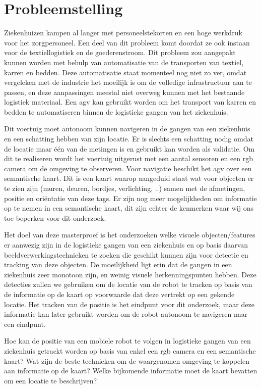 
\chapter{Probleemstelling}

Ziekenhuizen kampen al langer met personeelstekorten en een hoge werkdruk voor het zorgpersoneel. Een deel van dit probleem komt doordat ze ook instaan voor de textiellogistiek en de goederenstroom.
Dit probleem zou aangepakt kunnen worden met behulp van automatisatie van de transporten van textiel, karren en bedden. Deze automatisatie staat momenteel nog niet zo ver, omdat vergeleken met de industrie het moeilijk is om de volledige
infrastructuur aan te passen, en deze aanpassingen meestal niet overweg kunnen met het bestaande logistiek materiaal. Een \gls{agv} kan gebruikt worden om het transport van karren en bedden te automatiseren binnen de logistieke gangen van het ziekenhuis.

Dit voertuig moet autonoom kunnen navigeren in de gangen van een ziekenhuis en een schatting hebben van zijn locatie.
Er is slechts een schatting nodig omdat de locatie maar \'{e}\'{e}n van de metingen is en gebruikt kan worden als validatie.
Om dit te realiseren
wordt het voertuig uitgerust met een aantal sensoren en een \gls{rgb} camera om de omgeving te observeren. Voor navigatie beschikt het \gls{agv}
over een semantische kaart.
Dit is een kaart waarop aangeduid staat wat voor objecten er te zien zijn (muren, deuren, bordjes, verlichting, ..) samen met de afmetingen, positie en ori\"{e}ntatie van deze tags.
Er zijn nog meer mogelijkheden om informatie op te nemen in een semantische kaart, dit zijn echter de kenmerken waar wij ons toe beperken voor dit onderzoek.

Het doel van deze masterproef is het onderzoeken welke visuele objecten/features er aanwezig zijn in de logistieke gangen van een ziekenhuis en op basis daarvan
beeldverwerkingstechnieken te zoeken die geschikt kunnen zijn voor detectie en tracking van deze objecten.
De moeilijkheid ligt erin dat de gangen in een ziekenhuis zeer monotoon zijn, en weinig visuele herkenningspunten hebben.
Deze detecties zullen we gebruiken om de locatie van de robot te tracken op basis van de informatie op de kaart op voorwaarde dat deze vertrekt op een gekende locatie.
Het tracken van de positie is het eindpunt voor dit onderzoek, maar deze informatie kan later gebruikt worden om de robot autonoom te navigeren naar een eindpunt.

Hoe kan de positie van een mobiele robot te volgen in logistieke gangen van een ziekenhuis getrackt worden op basis van enkel een \gls{rgb} camera en een
semantische kaart?
Wat zijn de beste technieken om de waargenomen omgeving te koppelen aan informatie op de kaart?
Welke bijkomende informatie moet de kaart bevatten om een locatie te beschrijven?